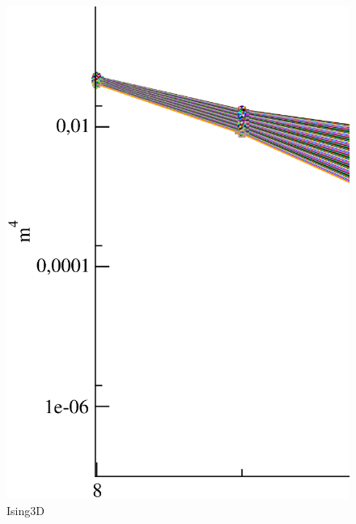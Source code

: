 \begin{figure}[!htpb]
  \centering
  \includegraphics[width=15cm]{./plots/Ising3D/Ising3D_M4_vs_L.eps}
  \caption{Ising3D}
\end{figure}

